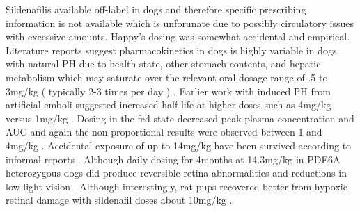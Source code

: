 Sildenafilis available off-label in dogs and therefore
specific prescribing information is not available which
is unforunate due to possibly circulatory issues with
excessive amounts. 
Happy's dosing was somewhat accidental and empirical.
Literature reports suggest pharmacokinetics in dogs
is highly variable in dogs with natural PH
due to health state, other stomach
contents, and hepatic metabolism which may saturate over
the relevant oral dosage range of .5 to 3mg/kg
( typically 2-3 times per day )
\cite{Yata_DeFrancesco_Bonagura_Population_Pharmacokinetics_Sildenafil_2026}
. 
Earlier work with induced PH from artificial emboli
suggested increased half life at higher doses
such as 4mg/kg versus 1mg/kg
\cite{Akabane_Sato_Sakatani_Pharmacokinetics_single_dose_2020}.
Dosing in the fed state decreased peak plasma concentration and AUC
and again the non-proportional results were observed between 1 and 4mg/kg
\cite{PMID29352474}.
Accidental exposure of up to 14mg/kg have been survived according
to informal reports \cite{agraham_Sildenafil_Exposure_2026}.
Although daily dosing for 4months at 14.3mg/kg in PDE6A heterozygous
dogs did produce reversible retina abnormalities and reductions
in low light vision
\cite{KEPierce_Bartoe_Hauptman_Sildenafil_Reduces_Retinal_Sensitivity_2009}
.
Although interestingly, rat pups recovered better from hypoxic 
retinal damage with sildenafil  doses about 10mg/kg
\cite{Jung_Johnstone_Khoja_Sildenafil_Improves_Functional_2016}.

